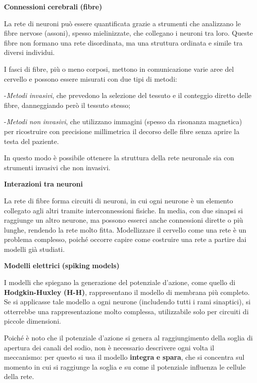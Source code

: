 \documentclass[12pt,a4paper]{book}
\begin{document}
\textbf{Connessioni}\textbf{ }\textbf{cerebrali}\textbf{ }\textbf{(fibre)}

La rete di neuroni può essere quantificata grazie a strumenti che analizzano le fibre nervose (assoni), spesso mielinizzate, che collegano i neuroni tra loro. Queste fibre non formano una rete disordinata, ma una struttura ordinata e simile tra diversi individui.

I fasci di fibre, più o meno corposi, mettono in comunicazione varie aree del cervello e possono essere misurati con due tipi di metodi:

-\textit{Metodi}\textit{ }\textit{invasivi}, che prevedono la selezione del tessuto e il conteggio diretto delle fibre, danneggiando però il tessuto stesso;

-\textit{Metodi}\textit{ }\textit{non}\textit{ }\textit{invasivi}, che utilizzano immagini (spesso da risonanza magnetica) per ricostruire con precisione millimetrica il decorso delle fibre senza aprire la testa del paziente.

In questo modo è possibile ottenere la struttura della rete neuronale sia con strumenti invasivi che non invasivi.

\textbf{Interazioni}\textbf{ }\textbf{tra}\textbf{ }\textbf{neuroni}

La rete di fibre forma circuiti di neuroni, in cui ogni neurone è un elemento collegato agli altri tramite interconnessioni fisiche. In media, con due sinapsi si raggiunge un altro neurone, ma possono esserci anche connessioni dirette o più lunghe, rendendo la rete molto fitta. Modellizzare il cervello come una rete è un problema complesso, poiché occorre capire come costruire una rete a partire dai modelli già studiati.

\textbf{Modelli}\textbf{ }\textbf{elettrici}\textbf{ }\textbf{(spiking}\textbf{ }\textbf{models)}

I modelli che spiegano la generazione del potenziale d'azione, come quello di \textbf{Hodgkin-Huxley}\textbf{ }\textbf{(H-H)}, rappresentano il modello di membrana più completo. Se si applicasse tale modello a ogni neurone (includendo tutti i rami sinaptici), si otterrebbe una rappresentazione molto complessa, utilizzabile solo per circuiti di piccole dimensioni.

Poiché è noto che il potenziale d'azione si genera al raggiungimento della soglia di apertura dei canali del sodio, non è necessario descrivere ogni volta il meccanismo: per questo si usa il modello \textbf{integra}\textbf{ }\textbf{e}\textbf{ }\textbf{spara}, che si concentra sul momento in cui si raggiunge la soglia e su come il potenziale influenza le cellule della rete.
\end{document}
